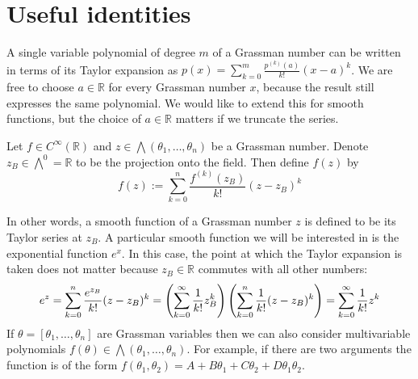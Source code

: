 \section{Useful identities}
A single variable polynomial of degree $m$ of a Grassman number can be written 
in terms of its Taylor expansion as 
$p(x) = \sum_{k=0}^{m} \frac{p^{(k)}(a)}{k!} (x-a)^k$.
We are free to choose $a\in\mathbb{R}$ for every Grassman number $x$, because the
result still expresses the same polynomial. We would like to extend this for
smooth functions, but the choice of $a\in\mathbb{R}$ matters if we truncate the
series. 
\begin{defn} \label{defn:grassman_function}
	Let $f\in C^\infty(\mathbb{R})$ and 
	$z \in \bigwedge(\theta_1,\ldots,\theta_n)$ be a Grassman number. 
	Denote $z_B \in \bigwedge^0 = \mathbb{R}$ to be the projection onto the 
	field. Then define $f(z)$ by
	\begin{equation}
	f(z) := \sum_{k=0}^{n} \frac{f^{(k)}(z_B)}{k!} (z-z_B)^k
	\end{equation}
\end{defn}
In other words, a smooth function of a Grassman number $z$ is defined to be its
Taylor series at $z_B$. A particular smooth function we will be interested in is
the exponential function $e^{x}$. In this case, the point at which the Taylor
expansion is taken does not matter because $z_B\in \mathbb{R}$ commutes with all
other numbers:
\begin{equation} \label{eq:grassman_exp}
e^{z}
=\sum_{k=0}^{n} \frac{e^{z_B}}{k!}(z-z_B)^k
= \paren{\sum_{k=0}^{\infty} \frac{1}{k!}z_B^k}\paren{\sum_{k=0}^{n} \frac{1}{k!}(z-z_B)^k}
= \sum_{k=0}^{\infty} \frac{1}{k!}z^k
\end{equation}
If $\theta=[\theta_1,\ldots,\theta_n]$ are Grassman variables then we can also
consider multivariable polynomials $f(\theta) \in
\bigwedge (\theta_1,\ldots,\theta_n)$. For example, if there are two arguments 
the function is of the form
$f(\theta_1,\theta_2)=A+B\theta_1+C\theta_2 + D\theta_1\theta_2$. 

